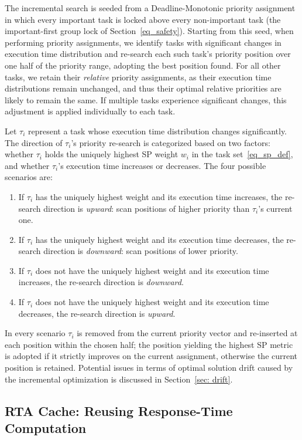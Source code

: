     The incremental search is seeded from a Deadline-Monotonic priority assignment in which every important task is locked above every non-important task (the important-first group lock of Section~\ref{eq_safety}).
    Starting from this seed, when performing priority assignments, we identify tasks with significant changes in execution time distribution and re-search each such task's priority position over one half of the priority range, adopting the best position found.
    For all other tasks, we retain their \textit{relative} priority assignments, as their execution time distributions remain unchanged, and thus their optimal relative priorities are likely to remain the same.
    If multiple tasks experience significant changes, this adjustment is applied individually to each task.


Let $\tau_i$ represent a task whose execution time distribution changes significantly.
The direction of $\tau_i$'s priority re-search is categorized based on two factors: whether $\tau_i$ holds the uniquely highest SP weight $w_i$ in the task set~\eqref{eq_sp_def}, and whether $\tau_i$'s execution time increases or decreases.
The four possible scenarios are:
\begin{enumerate}
    \item If $\tau_i$ has the uniquely highest weight and its execution time increases, the re-search direction is \emph{upward}: scan positions of higher priority than $\tau_i$'s current one.
    \item If $\tau_i$ has the uniquely highest weight and its execution time decreases, the re-search direction is \emph{downward}: scan positions of lower priority.
    \item If $\tau_i$ does not have the uniquely highest weight and its execution time increases, the re-search direction is \emph{downward}.
    \item If $\tau_i$ does not have the uniquely highest weight and its execution time decreases, the re-search direction is \emph{upward}.
\end{enumerate}
In every scenario $\tau_i$ is removed from the current priority vector and re-inserted at each position within the chosen half; the position yielding the highest SP metric is adopted if it strictly improves on the current assignment, otherwise the current position is retained.
Potential issues in terms of optimal solution drift caused by the incremental optimization is discussed in Section~\ref{sec: drift}.


	\subsection{RTA Cache: Reusing Response-Time Computation}
	\label{section_rta_cache}

